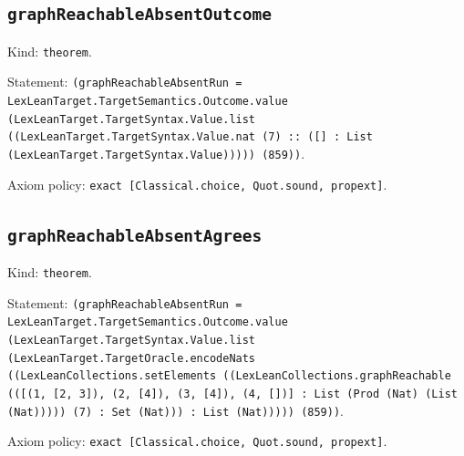\documentclass[11pt]{article}
\begin{document}
\subsection*{\texttt{graphReachableAbsentOutcome}}
\noindent Kind: \texttt{theorem}.\par
\noindent Statement: \texttt{(graphReachableAbsentRun = LexLeanTarget.TargetSemantics.Outcome.value (LexLeanTarget.TargetSyntax.Value.list ((LexLeanTarget.TargetSyntax.Value.nat (7) :: ([] : List (LexLeanTarget.TargetSyntax.Value))))) (859))}.\par
\noindent Axiom policy: \texttt{exact [Classical.choice, Quot.sound, propext]}.\par
\subsection*{\texttt{graphReachableAbsentAgrees}}
\noindent Kind: \texttt{theorem}.\par
\noindent Statement: \texttt{(graphReachableAbsentRun = LexLeanTarget.TargetSemantics.Outcome.value (LexLeanTarget.TargetSyntax.Value.list (LexLeanTarget.TargetOracle.encodeNats ((LexLeanCollections.setElements ((LexLeanCollections.graphReachable (([(1, [2, 3]), (2, [4]), (3, [4]), (4, [])] : List (Prod (Nat) (List (Nat))))) (7) : Set (Nat))) : List (Nat))))) (859))}.\par
\noindent Axiom policy: \texttt{exact [Classical.choice, Quot.sound, propext]}.\par
\end{document}
